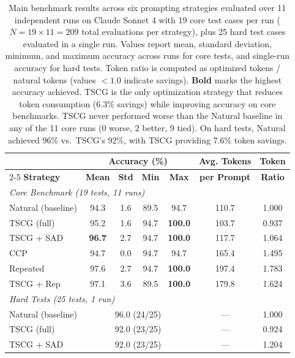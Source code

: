 \begin{table}[t]
\centering
\small
\begin{tabular}{@{}l cccc cc@{}}
\toprule
& \multicolumn{4}{c}{\textbf{Accuracy (\%)}} & \textbf{Avg. Tokens} & \textbf{Token} \\
\cmidrule(lr){2-5}
\textbf{Strategy} & \textbf{Mean} & \textbf{Std} & \textbf{Min} & \textbf{Max} & \textbf{per Prompt} & \textbf{Ratio} \\
\midrule
\multicolumn{7}{l}{\emph{Core Benchmark (19 tests, 11 runs)}} \\
\midrule
Natural (baseline)  & 94.3 & 1.6 & 89.5 & 94.7 & 110.7 & 1.000 \\
TSCG (full)         & 95.2 & 1.6 & 94.7 & \textbf{100.0} & 103.7 & 0.937 \\
TSCG + SAD          & \textbf{96.7} & 2.7 & 94.7 & \textbf{100.0} & 117.7 & 1.064 \\
CCP                 & 94.7 & 0.0 & 94.7 & 94.7 & 165.4 & 1.495 \\
Repeated            & 97.6 & 2.7 & 94.7 & \textbf{100.0} & 197.4 & 1.783 \\
TSCG + Rep          & 97.1 & 3.6 & 89.5 & \textbf{100.0} & 179.8 & 1.624 \\
\midrule
\multicolumn{7}{l}{\emph{Hard Tests (25 tests, 1 run)}} \\
\midrule
Natural (baseline)  & \multicolumn{4}{c}{96.0 (24/25)} & --- & 1.000 \\
TSCG (full)         & \multicolumn{4}{c}{92.0 (23/25)} & --- & 0.924 \\
TSCG + SAD          & \multicolumn{4}{c}{92.0 (23/25)} & --- & 1.204 \\
\bottomrule
\end{tabular}
\caption{Main benchmark results across six prompting strategies evaluated over 11 independent runs on Claude Sonnet 4 with 19 core test cases per run ($N=19 \times 11 = 209$ total evaluations per strategy), plus 25 hard test cases evaluated in a single run. Values report mean, standard deviation, minimum, and maximum accuracy across runs for core tests, and single-run accuracy for hard tests. Token ratio is computed as optimized tokens / natural tokens (values $<1.0$ indicate savings). \textbf{Bold} marks the highest accuracy achieved. TSCG is the only optimization strategy that reduces token consumption (6.3\% savings) while improving accuracy on core benchmarks. TSCG never performed worse than the Natural baseline in any of the 11 core runs (0 worse, 2 better, 9 tied). On hard tests, Natural achieved 96\% vs.\ TSCG's 92\%, with TSCG providing 7.6\% token savings.}
\label{tab:results}
\end{table}

